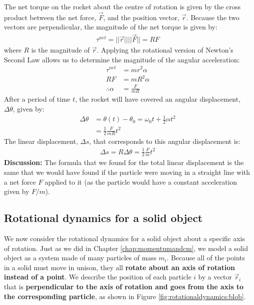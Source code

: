 \begin{example}
The net torque on the rocket about the centre of rotation is given by the cross product between the net force, $\vec F$, and the position vector, $\vec r$. Because the two vectors are perpendicular, the magnitude of the net torque is given by:
\begin{align*}
\tau^{net} = ||\vec r|| ||\vec F|| = RF
\end{align*}
where $R$ is the magnitude of $\vec r$. Applying the rotational version of Newton's Second Law allows us to determine the magnitude of the angular acceleration:
\begin{align*}
\tau ^{net} &= mr^2\alpha\\
RF &= mR^2\alpha\\
\therefore \alpha &= \frac{F}{mR}
\end{align*}
After a period of time $t$, the rocket will have covered an angular displacement, $\Delta \theta$, given by:
\begin{align*}
\Delta \theta &= \theta(t)-\theta_0 = \omega_0t + \frac{1}{2}\alpha t^2\\
&=\frac{1}{2}\frac{F}{mR} t^2
\end{align*}
The linear displacement, $\Delta s$, that corresponds to this angular displacement is:
\begin{align*}
\Delta s = R \Delta\theta = \frac{1}{2}\frac{F}{m} t^2
\end{align*}
\textbf{Discussion:} The formula that we found for the total linear displacement is the same that we would have found if the particle were moving in a straight line with a net force $F$ applied to it (as the particle would have a constant acceleration given by $F/m$).
\end{example}

\subsection{Rotational dynamics for a solid object}
We now consider the rotational dynamics for a solid object about a specific axis of rotation. Just as we did in Chapter \ref{chap:momentumandcm}, we model a solid object as a system made of many particles of mass $m_i$. Because all of the points in a solid must move in unison, they all \textbf{rotate about an axis of rotation instead of a point}. We describe the position of each particle $i$ by a vector $\vec r_i$ that is \textbf{perpendicular to the axis of rotation and goes from the axis to the corresponding particle}, as shown in Figure \ref{fig:rotationaldynamics:blob}.

